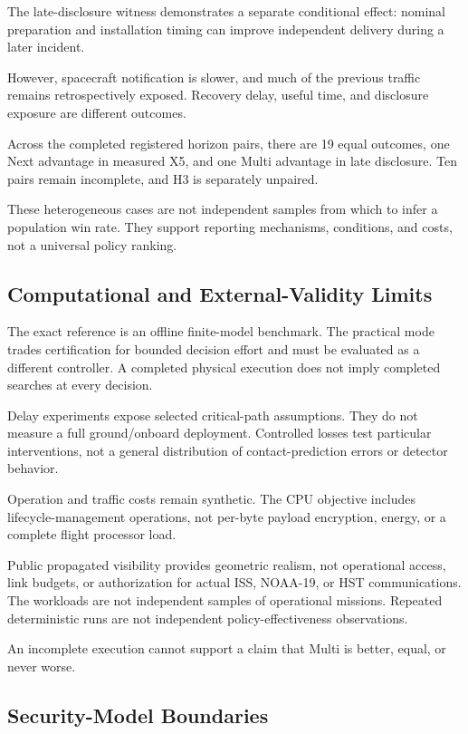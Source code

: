 \documentclass[conference]{IEEEtran}
\begin{document}
The late-disclosure witness demonstrates a separate conditional
effect:
nominal preparation and installation timing can improve
independent delivery during a later incident.

However, spacecraft notification is slower, and much of the
previous traffic remains retrospectively exposed.
Recovery delay, useful time, and disclosure exposure are
different outcomes.

Across the completed registered horizon pairs, there are
19 equal outcomes, one Next advantage in measured X5,
and one Multi advantage in late disclosure.
Ten pairs remain incomplete, and H3 is separately unpaired.

These heterogeneous cases are not independent samples from
which to infer a population win rate.
They support reporting mechanisms, conditions, and costs,
not a universal policy ranking.

\subsection{Computational and External-Validity Limits}

The exact reference is an offline finite-model benchmark.
The practical mode trades certification for bounded decision
effort and must be evaluated as a different controller.
A completed physical execution does not imply completed
searches at every decision.

Delay experiments expose selected critical-path assumptions.
They do not measure a full ground/onboard deployment.
Controlled losses test particular interventions, not a general
distribution of contact-prediction errors or detector behavior.

Operation and traffic costs remain synthetic.
The CPU objective includes lifecycle-management operations,
not per-byte payload encryption, energy, or a complete flight
processor load.

Public propagated visibility provides geometric realism,
not operational access, link budgets, or authorization for
actual ISS, NOAA-19, or HST communications.
The workloads are not independent samples of operational
missions.
Repeated deterministic runs are not independent
policy-effectiveness observations.

An incomplete execution cannot support a claim that Multi
is better, equal, or never worse.

\subsection{Security-Model Boundaries}
\end{document}
